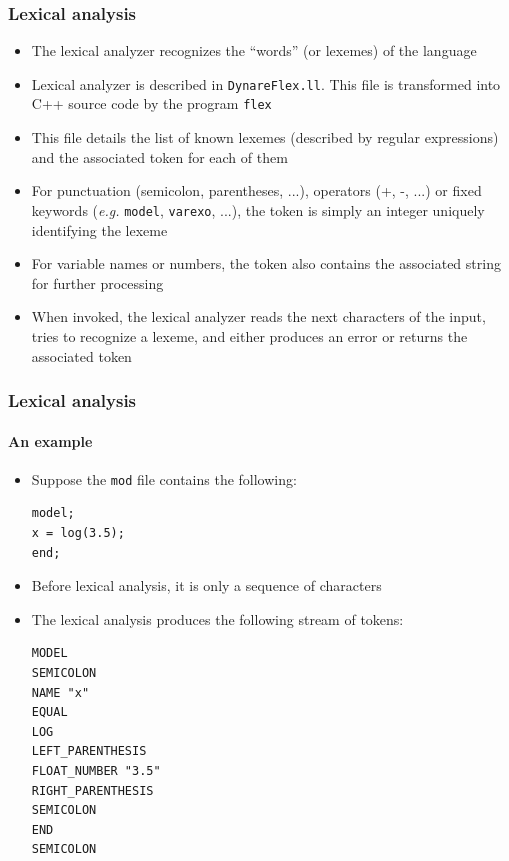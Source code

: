 \documentclass{beamer}
\begin{document}
\begin{frame}
\frametitle{Lexical analysis}
\begin{itemize}
\item The lexical analyzer recognizes the ``words'' (or \alert{lexemes}) of the language
\item Lexical analyzer is described in \texttt{DynareFlex.ll}. This file is transformed into C++ source code by the program \texttt{flex}
\item This file details the list of known lexemes (described by regular expressions) and the associated \alert{token} for each of them
\item For punctuation (semicolon, parentheses, ...), operators (+, -, ...) or fixed keywords (\textit{e.g.} \texttt{model}, \texttt{varexo}, ...), the token is simply an integer uniquely identifying the lexeme
\item For variable names or numbers, the token also contains the associated string for further processing
\item When invoked, the lexical analyzer reads the next characters of the input, tries to recognize a lexeme, and either produces an error or returns the associated token
\end{itemize}
\end{frame}

\begin{frame}[fragile]
\frametitle{Lexical analysis}
\framesubtitle{An example}
\begin{itemize}
\item Suppose the \texttt{mod} file contains the following:
\begin{verbatim}
model;
x = log(3.5);
end;
\end{verbatim}
\item Before lexical analysis, it is only a sequence of characters
\item The lexical analysis produces the following stream of tokens:

\begin{footnotesize}
\begin{verbatim}
MODEL
SEMICOLON
NAME "x"
EQUAL
LOG
LEFT_PARENTHESIS
FLOAT_NUMBER "3.5"
RIGHT_PARENTHESIS
SEMICOLON
END
SEMICOLON
\end{verbatim}
\end{footnotesize}
\end{itemize}
\end{frame}
\end{document}
